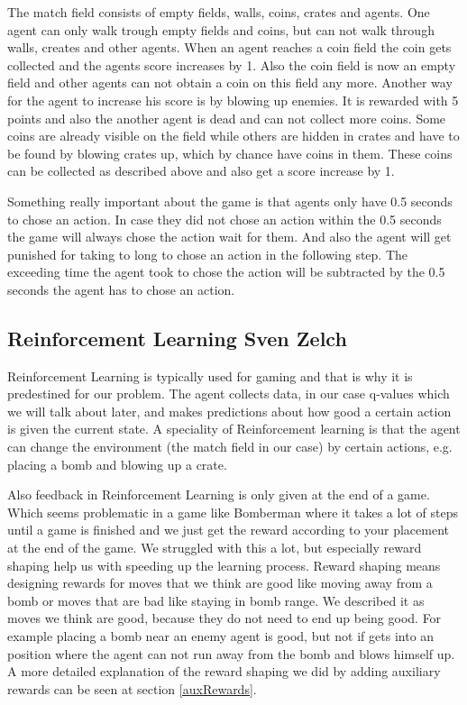 \documentclass[
	letterpaper, %
	12pt, %
]{CSUniSchoolLabReport}
\begin{document}
The match field consists of empty fields, walls, coins, crates and agents.
One agent can only walk trough empty fields and coins, but can not walk through walls, creates and other agents.
When an agent reaches a coin field the coin gets collected and the agents score increases by 1.
Also the coin field is now an empty field and other agents can not obtain a coin on this field any more.
Another way for the agent to increase his score is by blowing up enemies.
It is rewarded with 5 points and also the another agent is dead and can not collect more coins.
Some coins are already visible on the field while others are hidden in crates and have to be found by blowing crates up, which by chance have coins in them.
These coins can be collected as described above and also get a score increase by 1.

Something really important about the game is that agents only have 0.5 seconds to chose an action.
In case they did not chose an action within the 0.5 seconds the game will always chose the action wait for them.
And also the agent will get punished for taking to long to chose an action in the following step.
The exceeding time the agent took to chose the action will be subtracted by the 0.5 seconds the agent has to chose an action.

\subsection{Reinforcement Learning \tiny Sven Zelch}
Reinforcement Learning is typically used for gaming and that is why it is predestined for our problem.
The agent collects data, in our case q-values which we will talk about later, and makes predictions about how good a certain action is given the current state.
A speciality of Reinforcement learning is that the agent can change the environment (the match field in our case) by certain actions, e.g. placing a bomb and blowing up a crate.

Also feedback in Reinforcement Learning is only given at the end of a game.
Which seems problematic in a game like Bomberman where it takes a lot of steps until a game is finished and we just get the reward according to your placement at the end of the game.
We struggled with this a lot, but especially reward shaping help us with speeding up the learning process.
Reward shaping means designing rewards for moves that we think are good like moving away from a bomb or moves that are bad like staying in bomb range.
We described it as moves we think are good, because they do not need to end up being good.
For example placing a bomb near an enemy agent is good, but not if gets into an position where the agent can not run away from the bomb and blows himself up.
A more detailed explanation of the reward shaping we did by adding auxiliary rewards can be seen at section \ref{auxRewards}.
\end{document}
